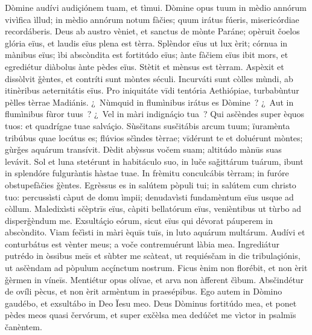 Dòmine audívi audiçiónem tuam, et tìmui. Dòmine opus tuum in mèdio annórum vivìfica ìllud; in mèdio annórum notum fàčies; quum irátus fúeris, misericórdiae recordáberis.
Deus ab austro vèniet, et sanctus de mònte Paráne; opèruit čoelos glória eïus, et laudis eïus plena est tèrra.
Splèndor eïus ut lux èrit; córnua in mànibus eïus; ìbi abscòndita est fortitúdo eïus;
ànte fàčiem eïus ibit mors, et egrediétur diàbolus ànte pèdes eïus.
Stètit et mènsus est tèrram. Aspèxit et dissòlvit ǧèntes, et contríti sunt mòntes séculi. Incurváti sunt còlles mùndi, ab itinèribus aeternitátis eïus.
Pro iniquitáte vīdi tentória Aethiópiae, turbabùntur pèlles tèrrae Madiánis.
¿~Nùmquid in flumìnibus irátus es Dòmine~? ¿~Aut in flumìnibus fùror tuus~? ¿~Vel in màri indignáçio tua~? Qui asčèndes super èquos tuos: et quadrígae tuae salváçio.
Sùsčitans susčitábis arcum tuum; ïuramènta tribúbus quae locútus es; flúvios sčìndes tèrrae;
vīdérunt te et doluérunt mòntes; gùrǧes aquárum transívit. Dèdit abỳssus vočem suam; altitúdo mànūs suas levávit.
Sol et luna stetérunt in habitáculo suo, in luče saǧittárum tuárum, ibunt in splendóre fulguràntis hàstae tuae.
In frèmitu conculcábis tèrram; in furóre obstupefàčies ǧèntes.
Egrèssus es in salútem pòpuli tui; in salútem cum christo tuo: percussìsti càput de domu ìmpii; denudavìsti fundamèntum eïus usque ad còllum.
Maledixìsti sčèptrīs eïus, càpiti bellatórum eïus, venièntibus ut tùrbo ad disperǧèndum me. Exsultáçio eórum, sicut eïus qui dévorat páuperem in abscòndito.
Viam fečìsti in màri èquīs tuīs, in luto aquárum multárum.
Audívi et conturbátus est vènter meus; a voče contremuérunt làbia mea. Ingrediátur putrédo in òssibus meīs et sùbter me scàteat, ut requiésčam in die tribulaçiónis, ut asčèndam ad pòpulum acçínctum nostrum.
Ficus ènim non florébit, et non èrit ǧèrmen in víneīs. Mentiétur opus olívae, et arva non àfferent čìbum. Absčindétur de ovíli pècus, et non èrit armèntum in praesépibus.
Ego autem in Dòmino gaudébo, et exsultábo in Deo Ïesu meo.
Deus Dòminus fortitúdo mea, et ponet pèdes meos quasi červórum, et super exčèlsa mea dedúčet me vìctor in psalmīs čanèntem.
